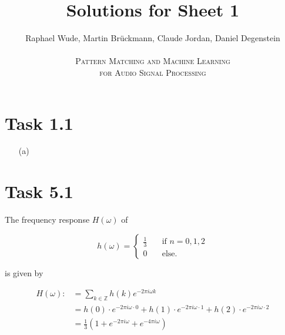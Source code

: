 \documentclass[12pt]{article}
\begin{document}
\title{Solutions for Sheet 1}
\author{Raphael Wude, Martin Brückmann, Claude Jordan, Daniel Degenstein\\ \\
\textsc{Pattern Matching and Machine Learning} \\
\textsc{for Audio Signal Processing}}
\maketitle

\section*{Task 1.1}
\begin{itemize}
    \item[(a)]
\end{itemize}
 
\section*{Task 5.1}
The frequency response $H(\omega)$ of

\[
h(\omega) =
    \begin{cases}
        \frac{1}{3} & \quad\text{if } n=0,1,2\\
        0 &\quad\text{else.}
    \end{cases}
\]

is given by

\begin{align*}
    H(\omega) :&= \sum_{k \in \mathbb{Z}} h(k)e^{-2 \pi i \omega k}\\
    &= h(0) \cdot e^{-2 \pi i \omega \cdot 0} + h(1) \cdot e^{-2 \pi i \omega \cdot 1} + h(2) \cdot e^{-2 \pi i \omega \cdot 2}\\
    &= \frac{1}{3} (1 + e^{-2 \pi i \omega} + e^{-4 \pi i \omega})
\end{align*}
\end{document}
